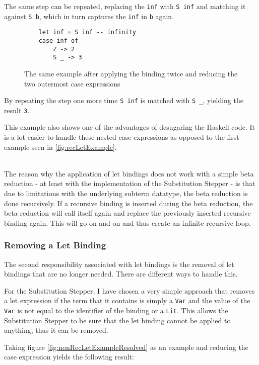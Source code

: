 The same step can be repeated,
replacing the \texttt{inf} with \texttt{S inf} and matching it against \texttt{S b},
which in turn captures the \texttt{inf} in \texttt{b} again.

\begin{figure}[!ht]
\begin{verbatim}
    let inf = S inf -- infinity
    case inf of
        Z -> 2
        S _ -> 3
\end{verbatim}
    \caption{The same example after applying the binding twice and reducing the two outermost case expressions}
    \label{fig:recLetExampleDesugared2}
\end{figure}

By repeating the step one more time \texttt{S inf} is matched with \texttt{S \_},
yielding the result \texttt{3}.

This example also shows one of the advantages of desugaring the Haskell code.
It is a lot easier to handle these nested case expressions as opposed to the first example seen in \ref*{fig:recLetExample}.

\ \\
The reason why the application of let bindings does not work with a simple beta reduction
- at least with the implementation of the Substitution Stepper -
is that due to limitations with the underlying subterm datatype,
the beta reduction is done recursively.
If a recursive binding is inserted during the beta reduction,
the beta reduction will call itself again and replace the previously inserted recursive binding again.
This will go on and on and thus create an infinite recursive loop.

\subsubsection{Removing a Let Binding}
The second responsibility associated with let bindings is the removal of let bindings that are no longer needed.
There are different ways to handle this.

For the Substitution Stepper,
I have chosen a very simple approach that removes a let expression if the term that it contains is simply a \texttt{Var} and the value of the \texttt{Var} is not equal to the identifier of the binding or a \texttt{Lit}.
This allows the Substitution Stepper to be sure that the let binding cannot be applied to anything,
thus it can be removed.

Taking figure \ref*{fig:nonRecLetExampleResolved} as an example and reducing the case expression yields the following result:

